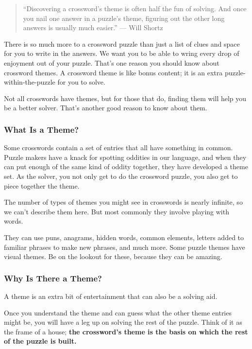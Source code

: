 \begin{quote}
``Discovering a crossword's theme is often half the fun of solving. And
once you nail one answer in a puzzle's theme, figuring out the other
long answers is usually much easier.'' --- Will Shortz
\end{quote}

There is so much more to a crossword puzzle than just a list of clues
and space for you to write in the answers. We want you to be able to
wring every drop of enjoyment out of your puzzle. That's one reason you
should know about crossword themes. A crossword theme is like bonus
content; it is an extra puzzle-within-the-puzzle for you to solve.~

Not all crosswords have themes, but for those that do, finding them will
help you be a better solver. That's another good reason to know about
them.

\hypertarget{what-is-a-theme}{%
\subsubsection{What Is a Theme?}\label{what-is-a-theme}}

Some crosswords contain a set of entries that all have something in
common. Puzzle makers have a knack for spotting oddities in our
language, and when they can put enough of the same kind of oddity
together, they have developed a theme set. As the solver, you not only
get to do the crossword puzzle, you also get to piece together the
theme.~

The number of types of themes you might see in crosswords is nearly
infinite, so we can't describe them here. But most commonly they involve
playing with words.

They can use puns, anagrams, hidden words, common elements, letters
added to familiar phrases to make new phrases, and much more. Some
puzzle themes have visual themes. Be on the lookout for these, because
they can be amazing.

\hypertarget{why-is-there-a-theme}{%
\subsubsection{Why Is There a Theme?}\label{why-is-there-a-theme}}

A theme is an extra bit of entertainment that can also be a solving
aid.~

Once you understand the theme and can guess what the other theme entries
might be, you will have a leg up on solving the rest of the puzzle.
Think of it as the frame of a house; \textbf{the crossword's theme is
the basis on which the rest of the puzzle is built.}

